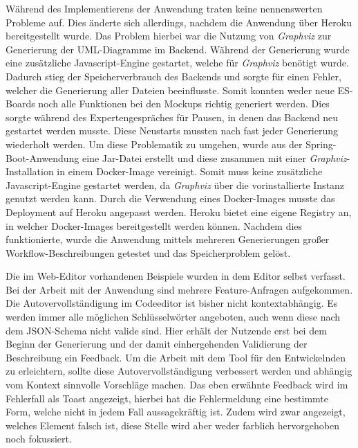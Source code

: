 Während des Implementierens der Anwendung traten keine nennenswerten Probleme auf.
Dies änderte sich allerdings, nachdem die Anwendung über Heroku bereitgestellt wurde.
Das Problem hierbei war die Nutzung von \textit{Graphviz} zur Generierung der UML-Diagramme im Backend.
Während der Generierung wurde eine zusätzliche Javascript-Engine gestartet, welche für \textit{Graphviz} benötigt wurde.
Dadurch stieg der Speicherverbrauch des Backends und sorgte für einen Fehler, welcher die Generierung aller Dateien beeinflusste.
Somit konnten weder neue \ac{ES}-Boards noch alle Funktionen bei den Mockups richtig generiert werden.
Dies sorgte während des Expertengespräches für Pausen, in denen das Backend neu gestartet werden musste.
Diese Neustarts mussten nach fast jeder Generierung wiederholt werden.
Um diese Problematik zu umgehen, wurde aus der Spring-Boot-Anwendung eine Jar-Datei erstellt und diese zusammen mit einer \textit{Graphviz}-Installation in einem Docker-Image
vereinigt\cite*{size-problem}.
Somit muss keine zusätzliche Javascript-Engine gestartet werden, da \textit{Graphviz} über die vorinstallierte Instanz genutzt werden kann.
Durch die Verwendung eines Docker-Images musste das Deployment auf Heroku angepasst werden.
Heroku bietet eine eigene Registry an, in welcher Docker-Images bereitgestellt werden können\cite*{heroku-registry}.
Nachdem dies funktionierte, wurde die Anwendung mittels mehreren Generierungen großer Workflow-Beschreibungen getestet und das Speicherproblem gelöst.

Die im Web-Editor vorhandenen Beispiele wurden in dem Editor selbst verfasst.
Bei der Arbeit mit der Anwendung sind mehrere Feature-Anfragen aufgekommen.
Die Autovervollständigung im Codeeditor ist bisher nicht kontextabhängig.
Es werden immer alle möglichen Schlüsselwörter angeboten, auch wenn diese nach dem JSON-Schema nicht valide sind.
Hier erhält der Nutzende erst bei dem Beginn der Generierung und der damit einhergehenden Validierung der Beschreibung ein Feedback.
Um die Arbeit mit dem Tool für den Entwickelnden zu erleichtern, sollte diese Autovervollständigung verbessert werden und abhängig vom Kontext
sinnvolle Vorschläge machen.
Das eben erwähnte Feedback wird im Fehlerfall als Toast angezeigt, hierbei hat die Fehlermeldung eine bestimmte Form, welche nicht in jedem Fall aussagekräftig ist.
Zudem wird zwar angezeigt, welches Element falsch ist, diese Stelle wird aber weder farblich hervorgehoben noch fokussiert.

